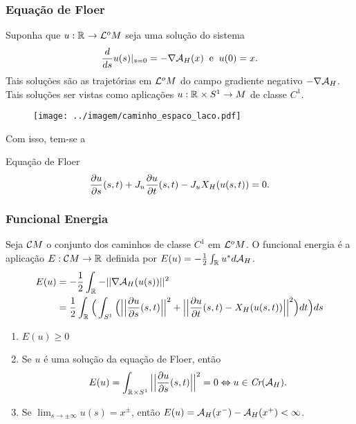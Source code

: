 \documentclass{beamer}
\begin{document}
\begin{footnotesize}
\begin{frame}
	\end{frame}
	
	\begin{frame}
		\frametitle{Equação de Floer}
		Suponha que $u :\mathbb{R}^{}\to \mathcal{L}^{o}M$ seja uma solução do sistema 
	$$
	\frac{d }{d s}u(s)|_{s=0} = -\nabla \mathcal{A}_{H}(x) \;\;\text{e}\;\;u(0)=x.
	$$
	Tais soluções são as trajetórias em $\mathcal{L}^{o}M$ do campo gradiente negativo $-\nabla \mathcal{A}_{H}$. Tais soluções ser vistas como aplicações $u:\mathbb{R}^{} \times S^{1} \to M$ de classe $C^{1}$.
	\begin{figure}[!h]
		\centering
		\texttt{[image: ../imagem/caminho\_espaco\_laco.pdf]}
	\end{figure} 
		
		Com isso, tem-se a
		\begin{block}{Equação de Floer}
			$$
			\frac{\partial u}{\partial s}(s,t) + J_{u}\frac{\partial u}{\partial t}(s,t) - J_{u}X_{H}(u(s,t))=0.
			$$
		\end{block}
	\end{frame}
	
	\begin{frame}
		\frametitle{Funcional Energia}
		
		Seja $\mathcal{C}M$ o conjunto dos caminhos de classe $C^{1}$ em $\mathcal{L}^{o}M$. O funcional energia é a aplicação $E: \mathcal{C}M \to \mathbb{R}^{}$ definida por $E(u)
		=-\frac{1}{2}\int_{\mathbb{R}^{}}u^{*}d\mathcal{A}_{H}$.
		$$
		\begin{aligned}
			E(u) &= -\frac{1}{2}\int_{\mathbb{R}^{}}-||\nabla \mathcal{A}_{H}(u(s))||^{2}
			\\
			&= \frac{1}{2}\int_{\mathbb{R}^{}}\Big(  \int_{S^{1}} \Big( \Big|\Big|\frac{\partial u}{\partial s}(s,t)\Big|\Big|^{2} + \Big|\Big|\frac{\partial u}{\partial t}(s,t) - X_{H}(u(s,t))\Big|\Big|^{2} \Big) dt  \Big)ds
		\end{aligned}
		$$
		
		\begin{enumerate}
			\item $E(u)\geq0$
			
			\item Se $u$ é uma solução da equação de Floer, então
			$$
			E(u)=\int_{\mathbb{R}^{} \times S^{1}}\Big|\Big|\frac{\partial u}{\partial s}(s,t)\Big|\Big|^{2} =0 \Leftrightarrow u \in \textit{Cr}(\mathcal{A}_{H}).
			$$
			
			\item Se $\lim_{s\to \pm\infty}u(s)=x^{\pm}$, então $E(u)=\mathcal{A}_{H}(x^{-}) - \mathcal{A}_{H}(x^{+})<\infty$.
		\end{enumerate}
	\end{frame}


\end{footnotesize}
\end{document}
